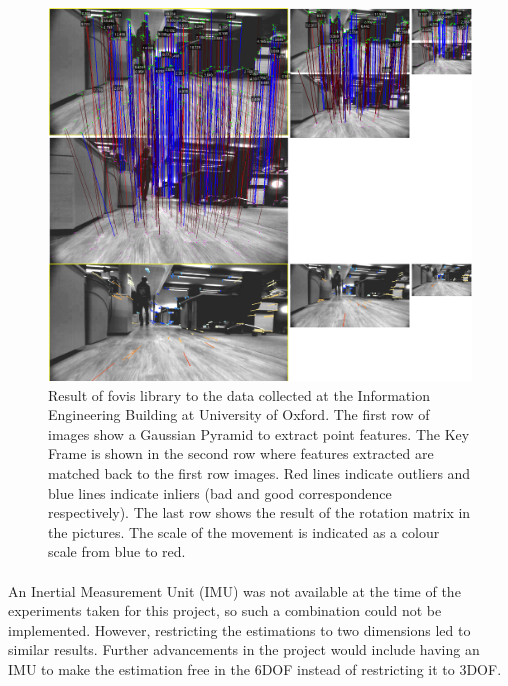 \documentclass[12pt]{article}
\begin{document}
	\begin{figure}
	\begin{minipage}{0.65\textwidth}
		\centering
		\includegraphics[width=\textwidth]{VisualOdometry1}
	\end{minipage} \hfill
	\begin{minipage}{0.35\textwidth}
		\centering
		\caption[t]{Result of fovis library to the data collected at the Information Engineering Building at University of Oxford. The first row of images show a Gaussian Pyramid to extract point features. The Key Frame is shown in the second row where features extracted are matched back to the first row images. Red lines indicate outliers and blue lines indicate inliers (bad and good correspondence respectively). The last row shows the result of the rotation matrix in the pictures. The scale of the movement is indicated as a colour scale from blue to red.}
			\label{fig:VisualOdometry1}	
	\end{minipage}				
	\end{figure}
		
	\paragraph{}
	An Inertial Measurement Unit (IMU) was not available at the time of the experiments taken for this project, so such a combination could not be implemented. However, restricting the estimations to two dimensions led to similar results. Further advancements in the project would include having an IMU to make the estimation free in the 6DOF instead of restricting it to 3DOF.
	
\end{document}
